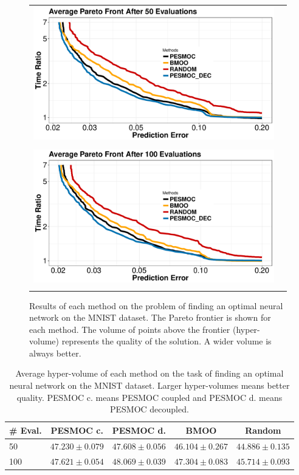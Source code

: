 \begin{figure}[H]
\begin{center}
        \begin{tabular}{cc}
                \vspace{-.2cm}
                \includegraphics[width=0.75\linewidth]{Figures/pesmoc/real/50_nnet.pdf} \\ \\
                \includegraphics[width=0.75\linewidth]{Figures/pesmoc/real/100_nnet.pdf} \\
                \vspace{-.1cm}
        \end{tabular}
        \caption{Results of each method on the problem of finding an optimal neural network on the MNIST dataset.
                The Pareto frontier is shown for each method. The volume of points above the frontier
                (hyper-volume) represents the quality of the solution. A wider volume is always better.}
        \label{fig:nnet_results}
\end{center}
\end{figure}

\begin{table}
\centering
\caption{Average hyper-volume of each method on the task of finding an optimal neural network on the MNIST dataset.
        Larger hyper-volumes means better quality. PESMOC c. means PESMOC coupled and PESMOC d. means
PESMOC decoupled.}
\begin{tabular}{lcccc}
 \hline
\textbf{\# Eval.} & \textbf{PESMOC c.} & \textbf{PESMOC d.} & \textbf{BMOO} & \textbf{Random} \\
 \hline
50 & $ 47.230  \pm  0.079 $ & $\mathbf{ 47.608  \pm  0.056 }$ & $ 46.104 \pm 0.267 $ & $ 44.886  \pm  0.135 $ \\
\hline
100 & $ 47.621  \pm  0.054 $ & $\mathbf{ 48.069  \pm  0.039 }$ & $ 47.304  \pm  0.083 $ & $ 45.714  \pm  0.093 $ \\
\hline
\end{tabular}
\label{table:aladdin_hypervolume}
\end{table}

